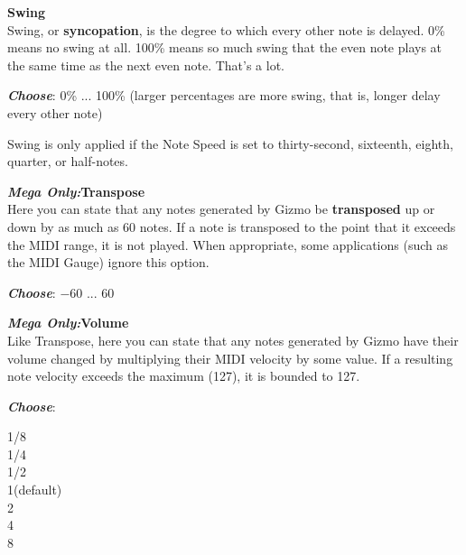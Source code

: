 \documentclass{article}
\begin{document}
\begin{description}
	\item{\bf Swing}\\
			Swing, or {\bf syncopation}, is the degree to which every other note is delayed.  0\% means no swing at all.  100\% means so much swing that the even note plays at the same time as the next even note.  That's a lot.
		\begin{description}
		\item{\bf \textit{Choose}}: 0\% ... 100\% (larger percentages are more swing, that is, longer delay every other note)
		\end{description}

		Swing is only applied if the Note Speed is set to thirty-second, sixteenth, eighth, quarter, or half-notes.

	\item{\bf \textit{Mega Only:}\quad Transpose}\\
		Here you can state that any notes generated by Gizmo be {\bf transposed} up or down by as much as 60 notes. If a note is transposed to the point that it exceeds the MIDI range, it is not played.  When appropriate, some applications (such as the MIDI Gauge) ignore this option. 
		\begin{description}
		\item{\bf \textit{Choose}}: \(-60\) ... 60 
		\end{description}

	\item{\bf \textit{Mega Only:}\quad Volume}\\
		Like Transpose, here you can state that any notes generated by Gizmo have their volume changed by multiplying their MIDI velocity by some value.  If a resulting note velocity exceeds the maximum (127), it is bounded to 127.
			
			\begin{description}
			\item{\bf \textit{Choose}}:
			\begin{tabbing}
			1/8\\
			1/4\\
			1/2\hspace{3.65in}\\
			1\qquad (default)\\
			2\\
			4\\
			8\\
			\end{tabbing}
		\end{description}


\end{description}
\end{document}

